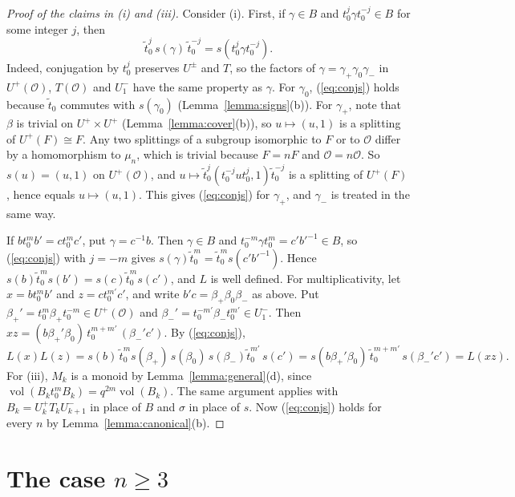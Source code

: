 \documentclass[12pt,letterpaper]{amsart}
\numberwithin{equation}{section}
\theoremstyle{definition}
\theoremstyle{remark}
\DeclareMathOperator{\vol}{vol}
\newcommand{\cO}{\mathcal{O}}
\begin{document}
\begin{proof}[Proof of the claims in (i) and (iii)]
Consider (i). First, if $\gamma\in B$ and $t_0^j\gamma t_0^{-j}\in B$
for some integer $j$, then
\begin{equation}
\label{eq:conjs}
\tilde t_0^j\,s(\gamma)\,\tilde t_0^{-j}=s(t_0^j\gamma t_0^{-j}).
\end{equation}
Indeed, conjugation by $t_0^j$ preserves $U^\pm$ and $T$, so the
factors of $\gamma=\gamma_+\gamma_0\gamma_-$ in $U^+(\cO)$, $T(\cO)$
and $U^-_1$ have the same property as $\gamma$. For $\gamma_0$,
(\ref{eq:conjs}) holds because $\tilde t_0$ commutes with $s(\gamma_0)$
(Lemma~\ref{lemma:signs}(b)). For $\gamma_+$, note that $\beta$ is
trivial on $U^+\times U^+$ (Lemma~\ref{lemma:cover}(b)), so $u\mapsto
(u,1)$ is a splitting of $U^+(F)\cong F$. Any two splittings of a
subgroup isomorphic to $F$ or to $\cO$ differ by a homomorphism to
$\mu_n$, which is trivial because $F=nF$ and $\cO=n\cO$. So $s(u)=(u,1)$
on $U^+(\cO)$, and $u\mapsto\tilde t_0^j(t_0^{-j}ut_0^j,1)\tilde
t_0^{-j}$ is a splitting of $U^+(F)$, hence equals $u\mapsto(u,1)$.
This gives (\ref{eq:conjs}) for $\gamma_+$, and $\gamma_-$ is treated in
the same way.

If $bt_0^mb'=ct_0^mc'$, put $\gamma=c^{-1}b$. Then $\gamma\in B$ and
$t_0^{-m}\gamma t_0^m=c'b'^{-1}\in B$, so (\ref{eq:conjs}) with $j=-m$
gives $s(\gamma)\tilde t_0^m=\tilde t_0^ms(c'b'^{-1})$. Hence
$s(b)\tilde t_0^ms(b')=s(c)\tilde t_0^ms(c')$, and $L$ is well
defined. For multiplicativity, let $x=bt_0^mb'$ and $z=ct_0^{m'}c'$,
and write $b'c=\beta_+\beta_0\beta_-$ as above. Put
$\beta_+'=t_0^m\beta_+t_0^{-m}\in U^+(\cO)$ and
$\beta_-'=t_0^{-m'}\beta_-t_0^{m'}\in U^-_1$. Then
$xz=(b\beta_+'\beta_0)\,t_0^{m+m'}\,(\beta_-'c')$. By (\ref{eq:conjs}),
\[
L(x)L(z)=s(b)\,\tilde t_0^m s(\beta_+)\,s(\beta_0)\,s(\beta_-)\tilde
t_0^{m'}\,s(c') =s(b\beta_+'\beta_0)\,\tilde
t_0^{m+m'}\,s(\beta_-'c')=L(xz).
\]
For (iii), $M_k$ is a monoid by Lemma~\ref{lemma:general}(d), since
$\vol(B_kt_0^mB_k)=q^{2m}\vol(B_k)$. The same argument applies with
$B_k=U^+_kT_kU^-_{k+1}$ in place of $B$ and $\sigma$ in place of $s$.
Now (\ref{eq:conjs}) holds for every $n$ by
Lemma~\ref{lemma:canonical}(b).
\end{proof}

\part{The case \texorpdfstring{$n\geq 3$}{n>=3}}
\end{document}
